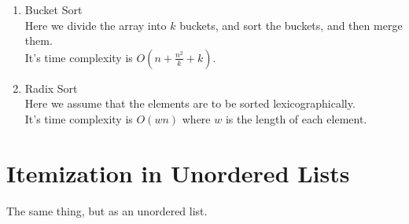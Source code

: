 \documentclass[12pt]{report}
\begin{document}
\begin{enumerate}
\begin{enumerate}
              \item Bucket Sort\\
                    Here we divide the array into $k$ buckets, and sort the buckets, and then merge them.\\
                    It's time complexity is $O(n + \frac{n^{2}}{k} + k)$.
              \item Radix Sort\\
                    Here we assume that the elements are to be sorted lexicographically.\\
                    It's time complexity is $O(wn)$ where $w$ is the length of each element.
          \end{enumerate}
\end{enumerate}

\section{Itemization in Unordered Lists}
The same thing, but as an unordered list.
\end{document}
